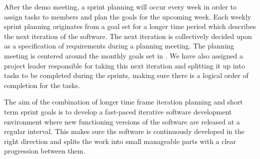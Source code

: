     After the demo meeting, a sprint planning will occur every week in order to assign tasks to members and plan the goals for the upcoming week. Each weekly sprint planning originates from a goal set for a longer time period which describes the next iteration of the software. The next iteration is collectively decided upon as a specification of requirements during a planning meeting. The planning meeting is centered around the monthly goals set in . We have also assigned a project leader responsible for taking this next iteration and splitting it up into tasks to be completed during the sprints, making sure there is a logical order of completion for the tasks.

    The aim of the combination of longer time frame iteration planning and short term sprint goals is to develop a fast-paced iterative software development environment where new functioning versions of the software are released at a regular interval. This makes sure the software is continuously developed in the right direction and splits the work into small manageable parts with a clear progression between them.